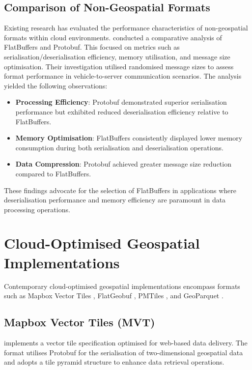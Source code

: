 \subsection{Comparison of Non-Geospatial Formats}
\label{rw:non_geospatial_formats:comparison}

Existing research has evaluated the performance characteristics of non-geospatial formats within cloud environments.
\citet{daniel_persson_2020} conducted a comparative analysis of FlatBuffers and Protobuf.
This focused on metrics such as serialisation/deserialisation efficiency, memory utilisation, and message size optimisation.
Their investigation utilised randomised message sizes to assess format performance in vehicle-to-server communication scenarios.
The analysis yielded the following observations:

\begin{itemize}
  \item \textbf{Processing Efficiency}: Protobuf demonstrated superior serialisation performance but exhibited reduced deserialisation efficiency relative to FlatBuffers.
  \item \textbf{Memory Optimisation}: FlatBuffers consistently displayed lower memory consumption during both serialisation and deserialisation operations.
  \item \textbf{Data Compression}: Protobuf achieved greater message size reduction compared to FlatBuffers.
\end{itemize}

These findings advocate for the selection of FlatBuffers in applications where deserialisation performance and memory efficiency are paramount in data processing operations.

\section{Cloud-Optimised Geospatial Implementations}
\label{rw:cloud_optimised_implementations}
Contemporary cloud-optimised geospatial implementations encompass formats such as Mapbox Vector Tiles \citep{mapbox-vector-tiles}, FlatGeobuf \citep{flatgeobuf}, PMTiles \citep{pmtiles}, and GeoParquet \citep{geoparquet}.

\subsection{Mapbox Vector Tiles (MVT)}
\label{rw:cloud_optimised_implementations:mvt}
\citet{mapbox-vector-tiles} implements a vector tile specification optimised for web-based data delivery. The format utilises Protobuf \citep{protobuf} for the serialisation of two-dimensional geospatial data and adopts a tile pyramid structure to enhance data retrieval operations.

